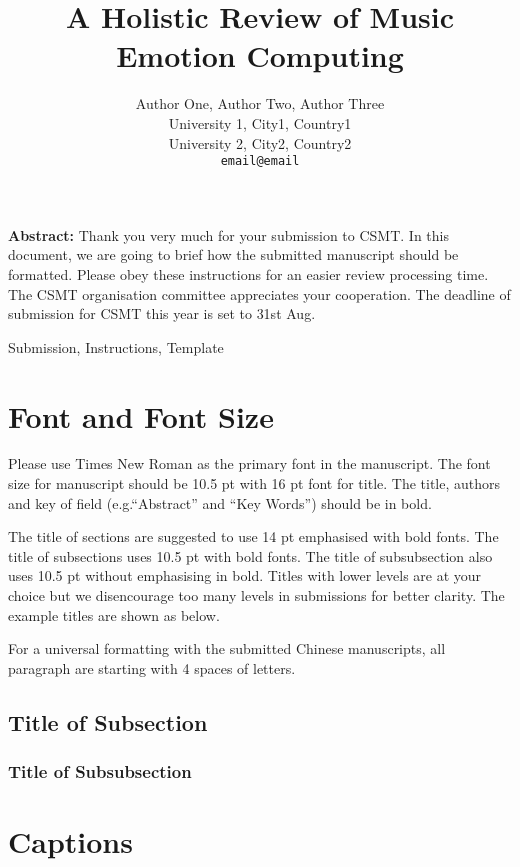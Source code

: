 \documentclass[UTF8,a4paper]{article}
\title{A Holistic Review of Music Emotion Computing}
\author{
	\textmd{\large Author One\affmark[1], Author Two\affmark[1], Author Three\affmark[1,2(\Letter)]}\\\vspace{0.27cm}
	\textmd{\affmark[1] University 1, City1, Country1}\\
	\textmd{\affmark[2] University 2, City2, Country2}\\
	\texttt{email@email}\\
}
\newenvironment{csmtAbstract}{\noindent \kaishu \small {\bfseries Abstract:}}{}
\newenvironment{keywords}{\small \noindent{\bfseries Key Words:}}{}
\begin{document}
\maketitle
\vspace{0.84cm}
\begin{csmtAbstract}
	Thank you very much for your submission to CSMT. In this document, we are going to brief how the submitted manuscript should be formatted. Please obey these instructions for an easier review processing time. The CSMT organisation committee appreciates your cooperation. The deadline of submission for CSMT this year is set to 31st Aug.
\end{csmtAbstract}

\begin{keywords}
	Submission, Instructions, Template
\end{keywords}

\section{Font and Font Size}

Please use Times New Roman as the primary font in the manuscript. The font size for manuscript should be 10.5 pt with 16 pt font for title. The title, authors and key of field (e.g.``Abstract'' and ``Key Words'') should be in bold.

The title of sections are suggested to use 14 pt emphasised with bold fonts. The title of subsections uses 10.5 pt with bold fonts. The title of subsubsection also uses 10.5 pt without emphasising in bold. Titles with lower levels are at your choice but we disencourage too many levels in submissions for better clarity. The example titles are shown as below.

For a universal formatting with the submitted Chinese manuscripts, all paragraph are starting with 4 spaces of letters.

\subsection{Title of Subsection}
\subsubsection{Title of Subsubsection}

\section{Captions}
\end{document}
